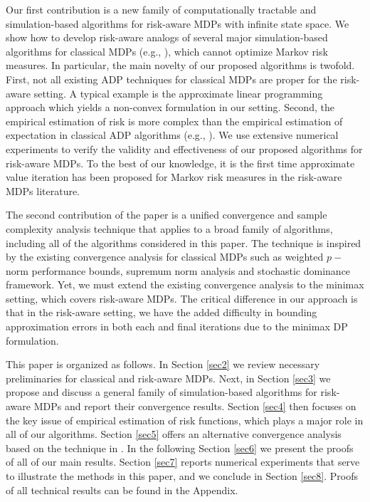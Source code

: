 \documentclass[12pt,technote,onecolumn]{IEEEtran}
\begin{document}
Our first contribution is a new family of computationally tractable and simulation-based algorithms for
risk-aware MDPs with infinite state space.  We show how to develop risk-aware analogs of several
major simulation-based algorithms for classical MDPs (e.g., \cite{jain2010simulation,munos2008finite}), which cannot optimize Markov risk measures.  In particular, the main novelty of our proposed algorithms is twofold. First, not all existing ADP techniques for classical MDPs are proper for the risk-aware setting. A typical example is the approximate linear programming approach \cite{de2003linear} which yields a non-convex formulation in our setting. Second, the empirical estimation of risk is more complex than the empirical estimation of expectation in  classical ADP algorithms (e.g., \cite{munos2008finite,Haskell_EDP_2015}). We use extensive numerical experiments to verify the validity and effectiveness of our proposed algorithms for risk-aware MDPs. To the best of our knowledge, it is the first time approximate value iteration has been proposed for Markov risk measures in the risk-aware MDPs literature. 

The second contribution of the paper is a unified convergence and sample complexity analysis technique that applies to a broad family of algorithms, including all of the algorithms considered
in this paper. The technique is inspired by the existing convergence analysis for classical MDPs such as weighted $p-$norm performance bounds\cite{munos2008finite}, supremum norm analysis\cite{jain2010simulation} and stochastic dominance framework\cite{Haskell_EDP_2015}. Yet, we must extend the existing convergence analysis to the minimax setting, which covers risk-aware MDPs. The critical difference in our approach is that in the risk-aware setting, we have the added difficulty in bounding approximation errors in both each and final iterations due to the minimax DP formulation.

This paper is organized as follows. In Section \ref{sec2} we review necessary
preliminaries for classical and risk-aware MDPs. Next, in Section
\ref{sec3} we propose and discuss a general family of simulation-based algorithms
for risk-aware MDPs and report their convergence results. Section
\ref{sec4} then focuses on the key issue of empirical estimation of risk functions,
which plays a major role in all of our algorithms. Section \ref{sec5} offers
an alternative convergence analysis based on the technique in \cite{Haskell_EDP_2015}.
In the following Section \ref{sec6} we present the proofs of all of our main
results. Section \ref{sec7} reports numerical experiments that serve to illustrate
the methods in this paper, and we conclude in Section \ref{sec8}. Proofs of all technical results can be found in the Appendix. 
\end{document}
